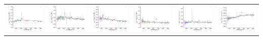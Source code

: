 \begin{center}
\begin{longtable}{l l l l l l }
    \includegraphics[width=0.3\linewidth, clip]{Figs/Figs-sdss/spec-3842-55565-0582-SPLUS-n02n20-021184.pdf} & \includegraphics[width=0.3\linewidth, clip]{Figs/Figs-sdss/spec-3845-55323-0406-SPLUS-n01s24-009687.pdf} & \includegraphics[width=0.3\linewidth, clip]{Figs/Figs-sdss/spec-3847-55588-0744-SPLUS-n02n27-026395.pdf} & \includegraphics[width=0.3\linewidth, clip]{Figs/Figs-sdss/spec-3847-55588-0794-SPLUS-n02n27-022071.pdf} & \includegraphics[width=0.3\linewidth, clip]{Figs/Figs-sdss/spec-4004-55321-0054-SPLUS-n02s37-051418.pdf} & \includegraphics[width=0.3\linewidth, clip]{Figs/Figs-sdss/spec-4194-55450-0185-STRIPE82-0119-046591.pdf} \\

\end{longtable}
\end{center}

